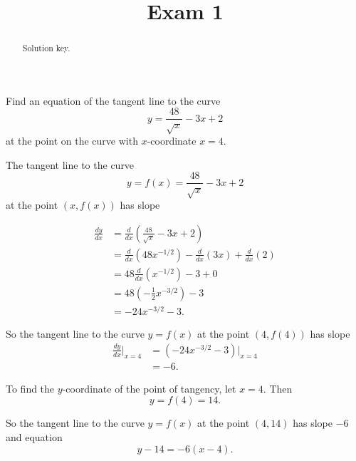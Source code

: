 \documentclass{ximera}
\title{Exam 1}
\begin{document}
\begin{abstract}
Solution key.
\end{abstract}
\maketitle


\begin{question} \label{Qpofer33}

Find an equation of the tangent line to the curve
\[
          y = \frac{48}{\sqrt{x}} - 3x + 2
\]
at the point on the curve with $x$-coordinate $x=4$.

\begin{explanation}
The tangent line to the curve
\[
   y = f(x) = \frac{48}{\sqrt{x}} - 3x + 2
\]
at the point $(x,f(x))$ has slope

\begin{align*}
\frac{dy}{dx} &= \frac{d}{dx} \left(    \frac{48}{\sqrt{x}} - 3x + 2   \right) \\
                    &= \frac{d}{dx} \left(  48x^{-1/2} \right)  - \frac{d}{dx}\left( 3x \right)  + \frac{d}{dx}(2)   \\
                &= 48 \frac{d}{dx} \left(  x^{-1/2} \right)  - 3   + 0   \\
                    &= 48 \left(-\frac{1}{2}x^{-3/2} \right) - 3   \\
                     &= -24x^{-3/2} - 3.
\end{align*}

So the tangent line to the curve $y=f(x)$ at the point $(4,f(4))$ has slope
\begin{align*}
\frac{dy}{dx}\Big|_{x=4}  &= \left(   -24x^{-3/2} - 3   \right) \Big|_{x=4} \\
                                      &= -6.
\end{align*}

To find the $y$-coordinate of the point of tangency, let $x=4$. Then
\[
 y = f(4) = 14.
\] 

So the tangent line to the curve $y=f(x)$ at the point $(4,14)$ has slope $-6$ and equation
\[
 y - 14 = -6(x-4).
\]
\end{explanation}
\end{question}
\end{document}
